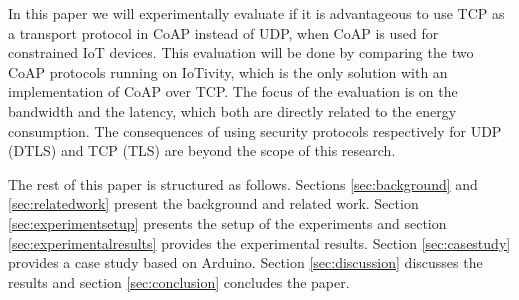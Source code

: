 

In this paper we will experimentally evaluate if it is advantageous to use TCP as a transport protocol in CoAP instead of UDP, when CoAP is used for constrained IoT devices.
This evaluation will be done by comparing the two CoAP protocols running on IoTivity, which is the only solution with an implementation of CoAP over TCP. The focus of the evaluation is on the bandwidth and the latency, which both are directly related to the energy consumption. The consequences of using security protocols respectively for UDP (DTLS) and TCP (TLS) are beyond the scope of this research.

The rest of this paper is structured as follows.  Sections \ref{sec:background} and \ref{sec:relatedwork} present the background and related work. Section \ref{sec:experimentsetup} presents the setup of the experiments and section \ref{sec:experimentalresults} provides the experimental results. Section \ref{sec:casestudy} provides a case study based on Arduino.  Section \ref{sec:discussion} discusses the results and section \ref{sec:conclusion} concludes the paper.    
